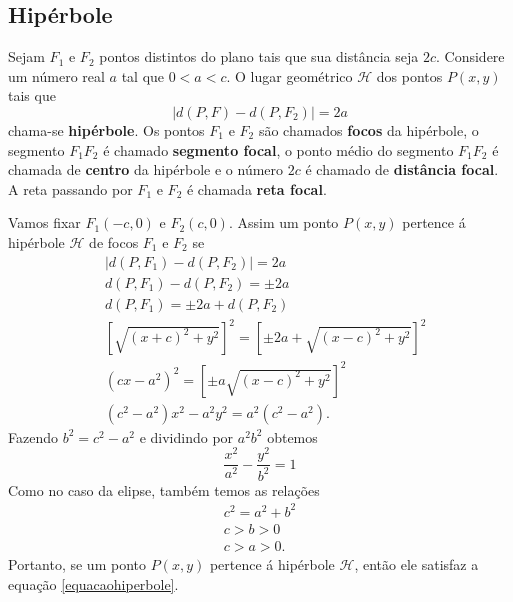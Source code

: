 
\subsection{Hipérbole} %
\label{sub:hiperbole}

\begin{definicao}
  Sejam $F_1$ e $F_2$ pontos distintos do plano tais que sua distância seja $2c$. Considere um n\'umero real $a$ tal que $0 < a < c$. O lugar geométrico $\mathcal{H}$ dos pontos $P(x,y)$ tais que
  \begin{equation}\label{equacaohiperbole}
    | d(P,F) - d(P,F_2)| = 2a
  \end{equation}
  chama-se \textbf{hipérbole}. Os pontos $F_1$ e $F_2$ são chamados \textbf{focos} da hipérbole, o segmento $F_1F_2$ é chamado \textbf{segmento focal}, o ponto médio do segmento $F_1F_2$ é chamada de \textbf{centro} da hipérbole e o n\'umero $2c$ é chamado de \textbf{distância focal}. A reta passando por $F_1$ e $F_2$ é chamada \textbf{reta focal}.     
\end{definicao}

Vamos fixar $F_1(-c,0)$ e $F_2(c,0)$. Assim um ponto $P(x,y)$ pertence á hipérbole $\mathcal{H}$ de focos $F_1$ e $F_2$ se
\begin{align*}
  &| d(P,F_1) - d(P,F_2) | = 2a\\
  &d(P,F_1) - d(P,F_2) = \pm 2a\\
  &d(P,F_1) = \pm 2a + d(P,F_2)\\
  &\left[\sqrt{(x + c)^2 + y^2}\right]^2 = \left[\pm 2a + \sqrt{(x - c)^2 + y^2}\right]^2\\
  &(cx - a^2)^2 = \left[\pm a\sqrt{(x - c)^2 + y^2}\right]^2\\
  &(c^2 - a^2)x^2 - a^2y^2 = a^2(c^2 - a^2).
\end{align*}
Fazendo $b^2 = c^2 - a^2$ e dividindo por $a^2b^2$ obtemos
\begin{equation}
  \dfrac{x^2}{a^2} - \dfrac{y^2}{b^2} = 1
\end{equation}
Como no caso da elipse, também temos as relações
\begin{align}
  c^2 = a^2 + b^2\\
  c > b > 0\label{pitagorashiperbole}\\
  c > a > 0.
\end{align}
Portanto, se um ponto $P(x,y)$ pertence á hipérbole $\mathcal{H}$, então ele satisfaz a equação \eqref{equacaohiperbole}.

